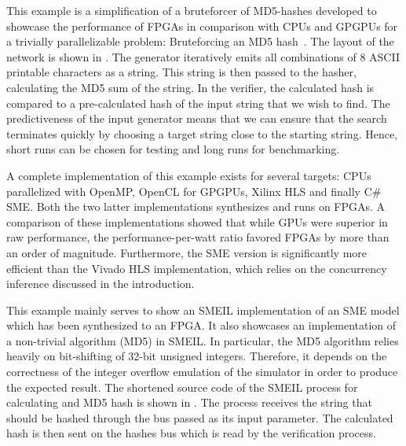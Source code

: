 This example is a simplification of a bruteforcer of MD5-hashes developed to
showcase the performance of FPGAs in comparison with CPUs and GPGPUs for a
trivially parallelizable problem: Bruteforcing an MD5
hash~\cite{johnsen2018md5}. The layout of the network is shown in
. The generator iteratively emits all combinations of 8 ASCII
printable characters as a string. This string is then passed to the hasher,
calculating the MD5 sum of the string. In the verifier, the calculated hash is
compared to a pre-calculated hash of the input string that we wish to find. The
predictiveness of the input generator means that we can ensure that the search
terminates quickly by choosing a target string close to the starting
string. Hence, short runs can be chosen for testing and long runs for
benchmarking.

A complete implementation of this example exists for several targets: CPUs
parallelized with OpenMP, OpenCL for GPGPUs, Xilinx HLS and finally C\# SME.
Both the two latter implementations synthesizes and runs on FPGAs. A comparison
of these implementations showed that while GPUs were superior in raw
performance, the performance-per-watt ratio favored FPGAs by more than an order
of magnitude. Furthermore, the SME version is significantly more efficient than
the Vivado HLS implementation, which relies on the concurrency inference
discussed in the introduction.

This example mainly serves to show an SMEIL implementation of an SME model which
has been synthesized to an FPGA. It also showcases an implementation of a
non-trivial algorithm (MD5) in SMEIL. In particular, the MD5 algorithm relies
heavily on bit-shifting of 32-bit unsigned integers. Therefore, it depends on
the correctness of the integer overflow emulation of the \libsme{} simulator in
order to produce the expected result. The shortened source code of the SMEIL
process for calculating and MD5 hash is shown in . The
process receives the string that should be hashed through the bus passed as its
{\ttfamily input} parameter. The calculated hash is then sent on the {\ttfamily
  hashes} bus which is read by the verification process.


